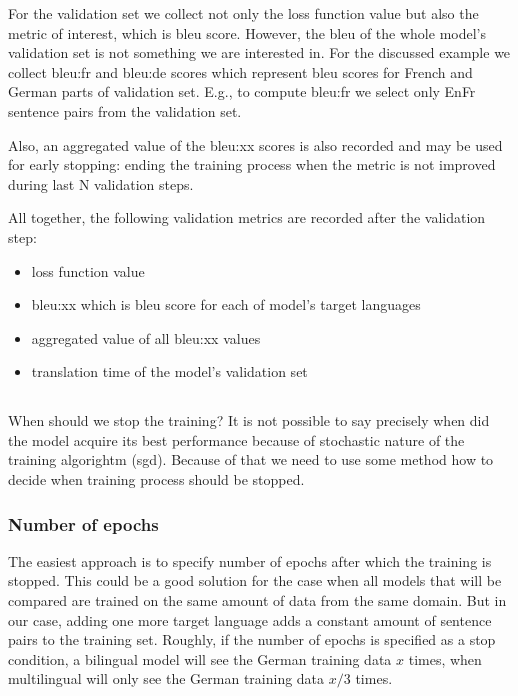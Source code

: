 For the validation set we collect not only the loss function value
but also the metric of interest, which is \acrshort{bleu} score.
However, the \acrshort{bleu} of the whole model's validation set
is not something we are interested in.
For the discussed example we collect bleu:fr and bleu:de scores
which represent \acrshort{bleu} scores for French and German
parts of validation set.
E.g., to compute bleu:fr we select only En\to{}Fr sentence pairs from the
validation set.

Also, an aggregated value of the bleu:xx scores is also recorded
and may be used for early stopping: ending the training process
when the metric is not improved during last N validation steps.

\begin{samepage}
All together, the following validation metrics are recorded after the
validation step:
\begin{itemize}
	\item loss function value
	\item bleu:xx which is \acrshort{bleu} score for each of
	model's target languages
	\item aggregated value of all bleu:xx values
	\item translation time of the model's validation set
\end{itemize}
\end{samepage}

\subsection{}
\label{section:finishing-the-training}

When should we stop the training?
It is not possible to say precisely when did the model
acquire its best performance because of stochastic nature of
the training algorightm (\acrshort{sgd}).
Because of that we need to use some method how to decide when
training process should be stopped.


\subsubsection*{Number of \glspl{epoch}}

The easiest approach is to specify number of \glspl{epoch}
after which the training is stopped.
This could be a good solution for the case when all models
that will be compared are trained on the same amount of data from
the same domain.
But in our case, adding one more target language adds a constant
amount of sentence pairs to the training set.
Roughly, if the number of \glspl{epoch} is specified as a stop
condition, a bilingual  model will see the German
training data $x$ times, when multilingual 
will only see the German training data $x / 3$ times.

